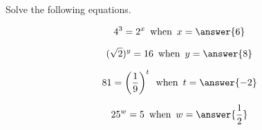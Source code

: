 \documentclass{ximera}
\author{Lee Wayand}
\begin{document}
\begin{exercise}





Solve the following equations.



\begin{question}  



\[
4^3 = 2^x \, \text{ when } \, x = \answer{6}
\]


\end{question}






\begin{question}  



\[
(\sqrt{2})^y = 16 \, \text{ when } \, y = \answer{8}
\]


\end{question}






\begin{question}  



\[
81 = \left( \frac{1}{9} \right)^t \, \text{ when } \, t = \answer{-2}
\]


\end{question}







\begin{question}  



\[
25^w = 5 \, \text{ when } \, w = \answer{\frac{1}{2}}
\]


\end{question}










\end{exercise}
\end{document}
